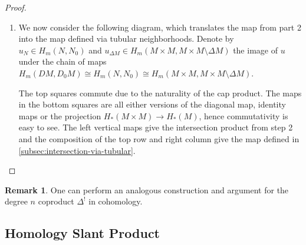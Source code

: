 \documentclass{scrartcl}
\theoremstyle{plain}
\theoremstyle{definition}
\newtheorem{remark}[theorem]{Remark}
\newcommand{\capp}{\mathbin{\frown}}
\newcommand{\iso}{\cong}
\begin{document}
\begin{proof}
\begin{enumerate}
        \item We now consider the following diagram, which translates the map from part 2 into the map defined via tubular neighborhoods.  Denote by $u_N\in H_m(N, N_0)$ and $u_{\Delta M}\in H_m(M\times M, M\times M\setminus \Delta M)$ the image of $u$ under the chain of maps $H_m(DM, D_0M) \iso H_m(N, N_0) \iso H_m(M\times M, M\times M\setminus \Delta M)$.
        
        \begin{center}
        \end{center}

        The top squares commute due to the naturality of the cap product. The maps in the bottom squares are all either versions of the diagonal map, identity maps or the projection $H_*(M\times M)\to H_*(M)$, hence commutativity is easy to see. The left vertical maps give the intersection product from step 2 and the composition of the top row and right column give the map defined in \ref{subsec:intersection-via-tubular}.
    \end{enumerate}

\end{proof}

\begin{remark}
    One can perform an analogous construction and argument for the degree $n$ coproduct $\Delta^!$ in cohomology.
\end{remark}


\subsection{Homology Slant Product}\label{subsec:slant_product}
\end{document}

